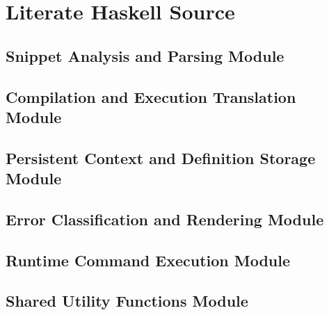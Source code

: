 \documentclass[11pt]{article}
\begin{document}
\clearpage
\section{Literate Haskell Source}
\subsection{Snippet Analysis and Parsing Module}

\subsection{Compilation and Execution Translation Module}

\subsection{Persistent Context and Definition Storage Module}

\subsection{Error Classification and Rendering Module}

\subsection{Runtime Command Execution Module}

\subsection{Shared Utility Functions Module}

\end{document}
